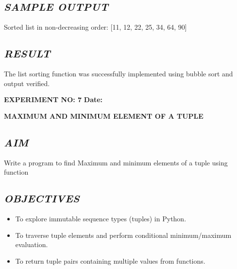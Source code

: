 \documentclass[11pt,a4paper]{article}
\begin{document}
\subsection*{\textit{SAMPLE OUTPUT}}
\begin{tcolorbox}[colback=black!85,colframe=navyblue,title=\textbf{Terminal Output},coltitle=white,fonttitle=\bfseries\small]
\small\ttfamily\color{green!30!white}
Sorted list in non-decreasing order: [11, 12, 22, 25, 34, 64, 90]
\end{tcolorbox}

\subsection*{\textit{RESULT}}
The list sorting function was successfully implemented using bubble sort and output verified.

\newpage

\noindent
\textbf{\large EXPERIMENT NO: 7} \hfill \textbf{\large Date: \underline{\hspace{3cm}}}

\vspace{0.2cm}
\begin{center}
{\Huge \textbf{\textcolor{navyblue}{MAXIMUM AND MINIMUM ELEMENT OF A TUPLE}}}
\end{center}
\vspace{0.3cm}

\subsection*{\textit{AIM}}
Write a program to find Maximum and minimum elements of a tuple using function

\subsection*{\textit{OBJECTIVES}}
\begin{itemize}
  \item To explore immutable sequence types (tuples) in Python.
  \item To traverse tuple elements and perform conditional minimum/maximum evaluation.
  \item To return tuple pairs containing multiple values from functions.
\end{itemize}
\end{document}
